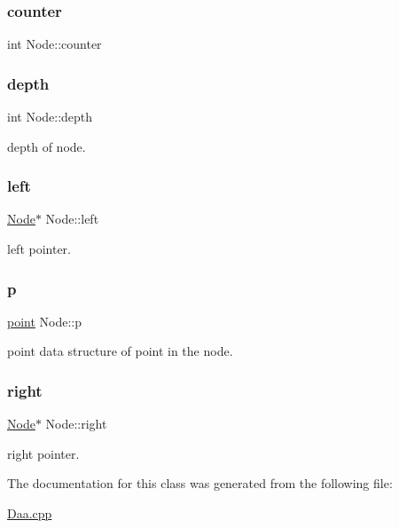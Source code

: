 \subsubsection{\texorpdfstring{counter}{counter}}
{\footnotesize\ttfamily int Node\+::counter}

\mbox{\label{class_node_af6e81d5e83ccce40726a0d0ec6e0e359}} 
\subsubsection{\texorpdfstring{depth}{depth}}
{\footnotesize\ttfamily int Node\+::depth}



depth of node. 

\mbox{\label{class_node_ab8c667ac8fdb120ed4c031682a9cdaee}} 
\subsubsection{\texorpdfstring{left}{left}}
{\footnotesize\ttfamily \hyperlink{class_node}{Node}$\ast$ Node\+::left}



left pointer. 

\mbox{\label{class_node_a4389b40ea26a0701517af65902423ac3}} 
\subsubsection{\texorpdfstring{p}{p}}
{\footnotesize\ttfamily \hyperlink{structpoint}{point} Node\+::p}



point data structure of point in the node. 

\mbox{\label{class_node_a7328862eaa6dea28018326549b3294d3}} 
\subsubsection{\texorpdfstring{right}{right}}
{\footnotesize\ttfamily \hyperlink{class_node}{Node}$\ast$ Node\+::right}



right pointer. 



The documentation for this class was generated from the following file\+:\begin{DoxyCompactItemize}
\item 
\hyperlink{_daa_8cpp}{Daa.\+cpp}\end{DoxyCompactItemize}
